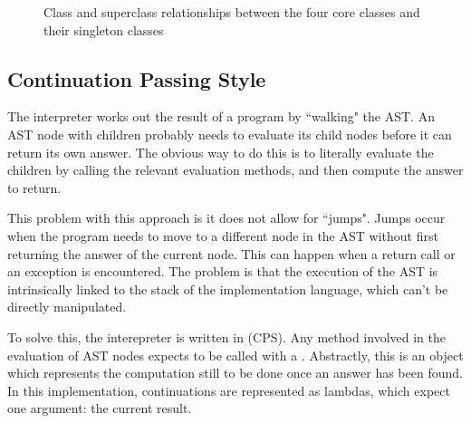 \begin{figure}
\begin{center}
\caption{Class and superclass relationships between the four core classes and their singleton classes}
\label{fig:core_relationships}
\end{center}
\end{figure}

\subsection{Continuation Passing Style}

The interpreter works out the result of a program by ``walking" the AST. An AST node with children probably needs to evaluate its child nodes before it can return its own answer. The obvious way to do this is to literally evaluate the children by calling the relevant evaluation methods, and then compute the answer to return.

This problem with this approach is it does not allow for ``jumps". Jumps occur when the program needs to move to a different node in the AST without first returning the answer of the current node. This can happen when a return call or an exception is encountered. The problem is that the execution of the AST is intrinsically linked to the stack of the implementation language, which can't be directly manipulated.

To solve this, the interepreter is written in  (CPS). Any method involved in the evaluation of AST nodes expects to be called with a . Abstractly, this is an object which represents the computation still to be done once an answer has been found. In this implementation, continuations are represented as lambdas, which expect one argument: the current result.


